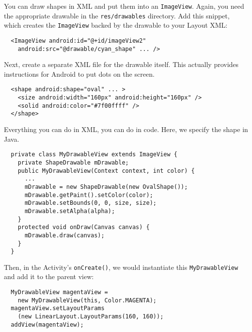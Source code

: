 You can draw shapes in XML and put them into an {\tt ImageView}.
Again, you need the appropriate drawable in the {\tt res/drawables}
directory.  Add this snippet, which creates the {\tt ImageView} backed
by the drawable to your Layout XML:
\begin{verbatim}
  <ImageView android:id="@+id/imageView2"
    android:src="@drawable/cyan_shape" ... />
\end{verbatim}
Next, create a separate XML file for the drawable itself. This actually
provides instructions for Android to put dots on the screen.
\begin{verbatim}
  <shape android:shape="oval" ... >
    <size android:width="160px" android:height="160px" />
    <solid android:color="#7f00ffff" />
  </shape>
\end{verbatim}

Everything you can do in XML, you can do in code. Here, we
specify the shape in Java.
\begin{verbatim}
  private class MyDrawableView extends ImageView {
    private ShapeDrawable mDrawable;
    public MyDrawableView(Context context, int color) {
      ...
      mDrawable = new ShapeDrawable(new OvalShape());
      mDrawable.getPaint().setColor(color);
      mDrawable.setBounds(0, 0, size, size);
      mDrawable.setAlpha(alpha);
    }
    protected void onDraw(Canvas canvas) {
      mDrawable.draw(canvas);
    }
  }
\end{verbatim}
Then, in the Activity's {\tt onCreate()}, we would instantiate
this {\tt MyDrawableView} and add it to the parent view:
\begin{verbatim}
  MyDrawableView magentaView = 
    new MyDrawableView(this, Color.MAGENTA);
  magentaView.setLayoutParams
    (new LinearLayout.LayoutParams(160, 160));
  addView(magentaView);
\end{verbatim}




